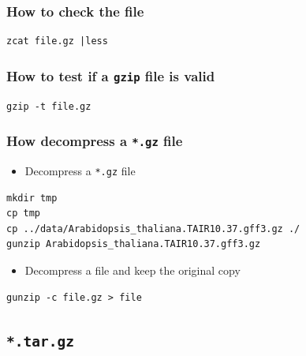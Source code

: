 \documentclass[]{book}
\providecommand{\tightlist}{%
  \setlength{\itemsep}{0pt}\setlength{\parskip}{0pt}}
\begin{document}
\hypertarget{how-to-check-the-file}{%
\subsubsection{How to check the file}\label{how-to-check-the-file}}

\begin{verbatim}
zcat file.gz |less 
\end{verbatim}

\hypertarget{how-to-test-if-a-gzip-file-is-valid}{%
\subsubsection{\texorpdfstring{How to test if a \texttt{gzip} file is valid}{How to test if a gzip file is valid}}\label{how-to-test-if-a-gzip-file-is-valid}}

\begin{verbatim}
gzip -t file.gz
\end{verbatim}

\hypertarget{how-decompress-a-.gz-file}{%
\subsubsection{\texorpdfstring{How decompress a \texttt{*.gz} file}{How decompress a *.gz file}}\label{how-decompress-a-.gz-file}}

\begin{itemize}
\tightlist
\item
  Decompress a \texttt{*.gz} file
\end{itemize}

\begin{verbatim}
mkdir tmp
cp tmp
cp ../data/Arabidopsis_thaliana.TAIR10.37.gff3.gz ./
gunzip Arabidopsis_thaliana.TAIR10.37.gff3.gz
\end{verbatim}

\begin{itemize}
\tightlist
\item
  Decompress a file and keep the original copy
\end{itemize}

\begin{verbatim}
gunzip -c file.gz > file
\end{verbatim}

\hypertarget{tar.gz}{%
\subsection{\texorpdfstring{\texttt{*.tar.gz}}{*.tar.gz}}\label{tar.gz}}
\end{document}
